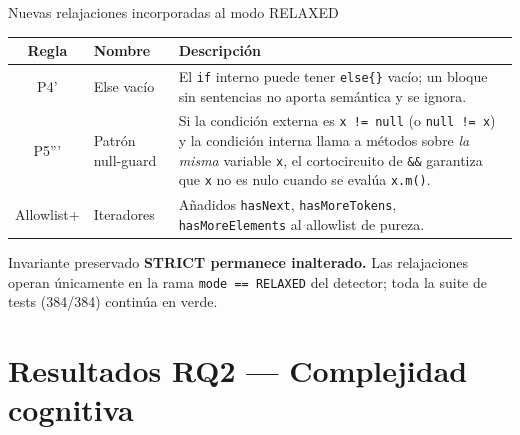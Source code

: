 \documentclass[aspectratio=169, 10pt]{beamer}
\begin{document}
\begin{frame}{Nuevas relajaciones incorporadas al modo RELAXED}
  \begin{table}
    \centering
    \footnotesize
    \begin{tabular}{clp{5.8cm}}
      \toprule
      \textbf{Regla} & \textbf{Nombre} & \textbf{Descripción} \\
      \midrule
      P4'
        & Else vacío
        & El \texttt{if} interno puede tener \texttt{else\{\}} vacío;
          un bloque sin sentencias no aporta semántica y se ignora. \\
      \addlinespace
      P5'''
        & Patrón null-guard
        & Si la condición externa es \texttt{x\,!=\,null} (o \texttt{null\,!=\,x})
          y la condición interna llama a métodos sobre \emph{la misma} variable
          \texttt{x}, el cortocircuito de \texttt{\&\&} garantiza que
          \texttt{x} no es nulo cuando se evalúa \texttt{x.m()}. \\
      \addlinespace
      Allowlist+
        & Iteradores
        & Añadidos \texttt{hasNext}, \texttt{hasMoreTokens},
          \texttt{hasMoreElements} al allowlist de pureza. \\
      \bottomrule
    \end{tabular}
  \end{table}

  \vspace{0.4em}
  \begin{block}{Invariante preservado}
    \textbf{STRICT permanece inalterado.} Las relajaciones operan
    únicamente en la rama \texttt{mode == RELAXED} del detector;
    toda la suite de tests (384/384) continúa en verde.
  \end{block}
\end{frame}

\section{Resultados RQ2 — Complejidad cognitiva}
\end{document}
